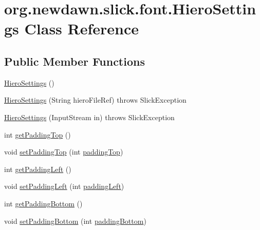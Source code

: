 \hypertarget{classorg_1_1newdawn_1_1slick_1_1font_1_1_hiero_settings}{}\section{org.\+newdawn.\+slick.\+font.\+Hiero\+Settings Class Reference}
\label{classorg_1_1newdawn_1_1slick_1_1font_1_1_hiero_settings}
\subsection*{Public Member Functions}
\begin{DoxyCompactItemize}
\item 
\mbox{\hyperlink{classorg_1_1newdawn_1_1slick_1_1font_1_1_hiero_settings_aab0436436662f22f0ee0cfae19bb98bf}{Hiero\+Settings}} ()
\item 
\mbox{\hyperlink{classorg_1_1newdawn_1_1slick_1_1font_1_1_hiero_settings_a4e6e92ba04b690351b768bf539cd7242}{Hiero\+Settings}} (String hiero\+File\+Ref)  throws Slick\+Exception 
\item 
\mbox{\hyperlink{classorg_1_1newdawn_1_1slick_1_1font_1_1_hiero_settings_a5a720011adeb6a61c51eb577476e5ad2}{Hiero\+Settings}} (Input\+Stream in)  throws Slick\+Exception 
\item 
int \mbox{\hyperlink{classorg_1_1newdawn_1_1slick_1_1font_1_1_hiero_settings_a931de092c482bfe91f3c807acc105021}{get\+Padding\+Top}} ()
\item 
void \mbox{\hyperlink{classorg_1_1newdawn_1_1slick_1_1font_1_1_hiero_settings_ab50154b8b80727a332d0e101ada84e6d}{set\+Padding\+Top}} (int \mbox{\hyperlink{classorg_1_1newdawn_1_1slick_1_1font_1_1_hiero_settings_ad0793e48192b48898df4f3a31d4b3954}{padding\+Top}})
\item 
int \mbox{\hyperlink{classorg_1_1newdawn_1_1slick_1_1font_1_1_hiero_settings_a978f51a4553ad3e4107998107d836ac7}{get\+Padding\+Left}} ()
\item 
void \mbox{\hyperlink{classorg_1_1newdawn_1_1slick_1_1font_1_1_hiero_settings_a388dcb6c9e1dc31fa8ef7f8d504b3967}{set\+Padding\+Left}} (int \mbox{\hyperlink{classorg_1_1newdawn_1_1slick_1_1font_1_1_hiero_settings_ae145770ffd7fbe5fb0bc1e54be252734}{padding\+Left}})
\item 
int \mbox{\hyperlink{classorg_1_1newdawn_1_1slick_1_1font_1_1_hiero_settings_a883802c2c59295e5bda8843e09f7d895}{get\+Padding\+Bottom}} ()
\item 
void \mbox{\hyperlink{classorg_1_1newdawn_1_1slick_1_1font_1_1_hiero_settings_a0f14e4e7880ac7e4ea87215de3f4d18b}{set\+Padding\+Bottom}} (int \mbox{\hyperlink{classorg_1_1newdawn_1_1slick_1_1font_1_1_hiero_settings_a4ae9e95c341789431f72c0d7ad54b348}{padding\+Bottom}})

\end{DoxyCompactItemize}
